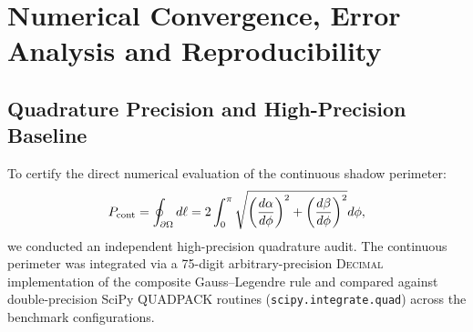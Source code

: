 \section{Numerical Convergence, Error Analysis and Reproducibility}
\label{sec:numerical_error_analysis}

\subsection{Quadrature Precision and High-Precision Baseline}
To certify the direct numerical evaluation of the continuous shadow perimeter:
\begin{equation}
    P_{\rm cont} = \oint_{\partial\Omega} d\ell = 2 \int_0^\pi \sqrt{\left(\frac{d\alpha}{d\phi}\right)^2 + \left(\frac{d\beta}{d\phi}\right)^2} d\phi,
    \label{eq:p_cont_integral}
\end{equation}
we conducted an independent high-precision quadrature audit. The continuous perimeter was integrated via a 75-digit arbitrary-precision \textsc{Decimal} implementation of the composite Gauss--Legendre rule and compared against double-precision SciPy \textsc{QUADPACK} routines (\texttt{scipy.integrate.quad}) across the benchmark configurations.

